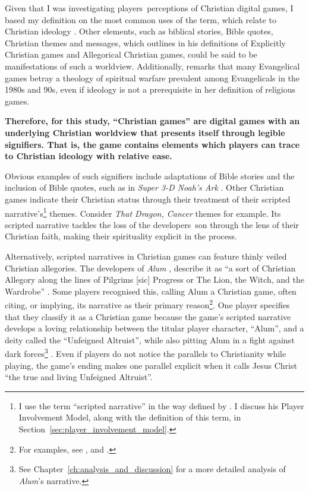 Given that I was investigating players\textquotesingle\ perceptions of Christian digital games, I based my definition on the most common uses of the term, which relate to Christian ideology \parencite{schut_swords_2026}. Other elements, such as biblical stories, Bible quotes, Christian themes and messages, which \textcite{schut_making_2013} outlines in his definitions of Explicitly Christian games and Allegorical Christian games, could be said to be manifestations of such a worldview. Additionally, \textcite{gonzalez_born-again_2014} remarks that many Evangelical games betray a theology of spiritual warfare prevalent among Evangelicals in the 1980s and 90s, even if ideology is not a prerequisite in her definition of religious games.

\begin{displayquote}
\textbf{Therefore, for this study, ``Christian games'' are digital games with an underlying Christian worldview that presents itself through legible signifiers. That is, the game contains elements which players can trace to Christian ideology with relative ease. }
\end{displayquote}

Obvious examples of such signifiers include adaptations of Bible stories and the inclusion of Bible quotes, such as in \textit{Super 3-D Noah's Ark} \parencite{wisdom_tree_super_2014}. Other Christian games indicate their Christian status through their treatment of their scripted narrative's\footnote{I use the term ``scripted narrative'' in the way defined by \textcite{calleja_in_game_2011}. I discuss his Player Involvement Model, along with the definition of this term, in Section~\ref{sec:player_involvement_model}.} themes. Consider \textit{That Dragon, Cancer} \parencite{numinous_games_that_2016} themes for example. Its scripted narrative tackles the loss of the developers\textquotesingle\  son through the lens of their Christian faith, making their spirituality explicit in the process.

Alternatively, scripted narratives in Christian games can feature thinly veiled Christian allegories. The developers of \textit{Alum} \parencite{orsie_alum_2006}, describe it as ``a sort of Christian Allegory along the lines of Pilgrims [sic] Progress or The Lion, the Witch, and the Wardrobe'' \parencite{crashable_studios_alum_2015}. Some players recognised this, calling Alum a Christian game, often citing, or implying, its narrative as their primary reason\footnote{For examples, see \textcite{arkane_review_2015}, \textcite{hamja_review_2015} and \textcite{virotti_review_2017}.}. One player specifies that they classify it as a Christian game because the game's scripted narrative develops a loving relationship between the titular player character, ``Alum'', and a deity called the ``Unfeigned Altruist'', while also pitting Alum in a fight against dark forces\footnote{See Chapter~\ref{ch:analysis_and_discussion} for a more detailed analysis of \textit{Alum}'s narrative.} \parencite{thomascanarias_review_2016}. Even if players do not notice the parallels to Christianity while playing, the game's ending makes one parallel explicit when it calls Jesus Christ ``the true and living Unfeigned Altruist''.

